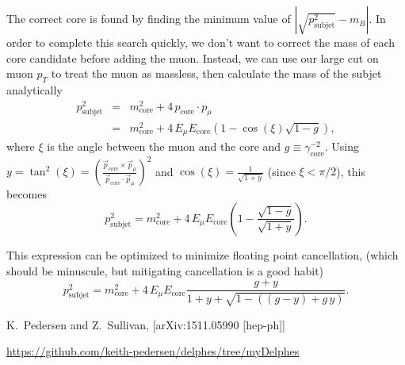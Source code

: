\documentclass[10pt]{article}
\newcommand{\pT}{p_{T}^{}}
\newcommand{\pSubjet}[1][] {p_{\mathrm{subjet}}^{#1}}
\newcommand{\pCore}[1][]   {p_{\mathrm{core}}^{#1}}
\newcommand{\pCoreV}       {\vec{p}_{\mathrm{core}}^{}}
\newcommand{\pMu}[1][]     {p_{\mu}^{#1}}
\newcommand{\pMuV}       {\vec{p}_{\mu}^{}}
\newcommand{\mCore}[1][]     {m_{\mathrm{core}}^{#1}}
\newcommand{\ECore}[1][]     {E_{\mathrm{core}}^{#1}}
\newcommand{\gammaCore}[1][] {\gamma_{\mathrm{core}}^{#1}}
\newcommand{\EMu}[1][]       {E_{\mu}^{#1}}
\begin{document}
The correct core is found by finding the minimum value of 
$\left|\sqrt{\pSubjet[2]}-m_B^{}\right|$. In order to complete this search 
quickly, we don't want to correct the mass of each core candidate before
adding the muon. Instead, we can use our large cut on muon $\pT$ to treat
the muon as massless, then calculate the mass of the subjet analytically
%
\begin{eqnarray}
\pSubjet[2] & = & \mCore[2]+4\,\pCore\cdot\pMu \nonumber \\
& = & \mCore[2]+4\,\EMu\ECore(1-\cos(\xi)\sqrt{1-g}),
\end{eqnarray}
%
where $\xi$ is the angle between the muon and the core and $g\equiv\gammaCore[-2]$.
Using $y=\tan^{2}(\xi)=\left(\frac{\pCoreV\times\pMuV}{\pCoreV\cdot\pMuV}\right)^2$
and $\cos(\xi)=\frac{1}{\sqrt{1+y}}$ (since $\xi<\pi/2$), this becomes
%
\begin{equation}
\pSubjet[2]=\mCore[2]+4\,\EMu\ECore(1-\frac{\sqrt{1-g}}{\sqrt{1+y}}).
\end{equation}
%

This expression can be optimized to minimize floating point cancellation,
(which should be minuscule, but mitigating cancellation is a good habit)
%
\begin{equation}
\pSubjet[2]=\mCore[2]+4\,\EMu\ECore\frac{g+y}{1+y+\sqrt{1-((g-y)+g\,y)}}.
\end{equation}

\begin{thebibliography}{}

  K.~Pedersen and Z.~Sullivan,
  [arXiv:1511.05990 [hep-ph]]

  \url{https://github.com/keith-pedersen/delphes/tree/myDelphes}

\end{thebibliography}
\end{document}
